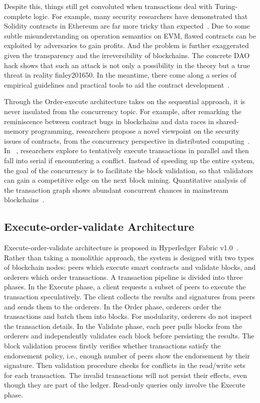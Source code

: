 Despite this, things still get convoluted when transactions deal with Turing-complete logic. For example, many security researchers have demonstrated that Solidity contracts in Ethereum are far more tricky than expected~\cite{luu2016making,parizi2018smart,atzei2017survey}. 
Due to some subtle misunderstanding on operation semantics on EVM, flawed contracts can be exploited by adversaries to gain profits. 
And the problem is further exaggerated given the transparency and the irreversibility of blockchains. 
The concrete DAO hack shows that such an attack is not only a possibility in the theory but a true threat in reality finley201650. 
In the meantime, there come along a series of empirical guidelines and practical tools to aid the contract development~\cite{ducasse2019open,jeng2019step,bai2018formal,tikhomirov2018smartcheck}. 

Through the Order-execute architecture takes on the sequential approach, it is never insulated from the concurrency topic. 
For example, after remarking the reminiscence between contract bugs in blockchains and data races in shared-memory programming, researchers propose a novel viewpoint on the security issues of contracts, from the concurrency perspective in distributed computing~\cite{herlihy2019blockchains,sergey2017concurrent}. 
In ~\cite{dickerson2019adding}, researchers explore to tentatively execute transactions in parallel and then fall into serial if encountering a conflict.  
Instead of speeding up the entire system, the goal of the concurrency is to facilitate the block validation, so that validators can gain a competitive edge on the next block mining. 
Quantitative analysis of the transaction graph shows abundant concurrent chances in mainstream blockchains~\cite{reijsbergen2020exploiting,saraph2019empirical}. 

\subsection{Execute-order-validate Architecture}
Execute-order-validate architecture is proposed in Hyperledger Fabric v1.0~\cite{androulaki2018hyperledger}. 
Rather than taking a monolithic approach, the system is designed with two types of blockchain nodes: peers which execute smart contracts and validate blocks, and orderers which order transactions. 
A transaction pipeline is divided into three phases. 
In the Execute phase, a client requests a subset of peers to execute the transaction speculatively. 
The client collects the results and signatures from peers and sends them to the orderers. 
In the Order phase, orderers order the transactions and batch them into blocks.
For modularity, orderers do not inspect the transaction details. 
In the Validate phase, each peer pulls blocks from the orderers and independently validates each block before persisting the results. 
The block validation process firstly verifies whether transactions satisfy the endorsement policy, i.e., enough number of peers show the endorsement by their signature. 
Then validation procedure checks for conflicts in the read/write sets for each transaction. 
The invalid transactions will not persist their effects, even though they are part of the ledger. 
Read-only queries only involve the Execute phase. 

